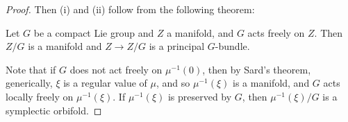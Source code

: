 \documentclass[a4paper]{article}
\begin{document}
\begin{proof}
  Then (i) and (ii) follow from the following theorem:
  \begin{thm}
    Let $G$ be a compact Lie group and $Z$ a manifold, and $G$ acts freely on $Z$. Then $Z/G$ is a manifold and $Z \to Z/G$ is a principal $G$-bundle.
  \end{thm}
%
%
%
  Note that if $G$ does not act freely on $\mu^{-1}(0)$, then by Sard's theorem, generically, $\xi$ is a regular value of $\mu$, and so $\mu^{-1}(\xi)$ is a manifold, and $G$ acts locally freely on $\mu^{-1}(\xi)$. If $\mu^{-1}(\xi)$ is preserved by $G$, then $\mu^{-1}(\xi)/G$ is a symplectic orbifold.


\end{proof}
\end{document}
